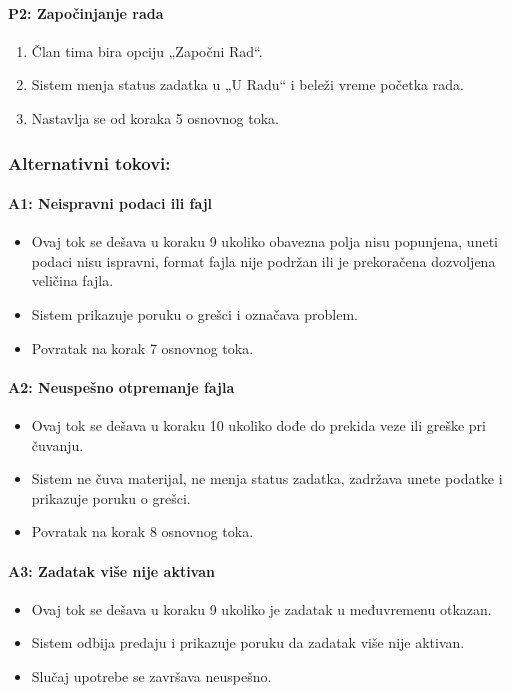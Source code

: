 \paragraph*{P2: Započinjanje rada}
\begin{enumerate}
	\item Član tima bira opciju „Započni Rad“.
	\item Sistem menja status zadatka u „U Radu“ i beleži vreme početka rada.
	\item Nastavlja se od koraka 5 osnovnog toka.
\end{enumerate}

\subsubsection*{Alternativni tokovi:}

\paragraph*{A1: Neispravni podaci ili fajl}
\begin{itemize}
	\item Ovaj tok se dešava u koraku 9 ukoliko obavezna polja nisu popunjena, uneti podaci nisu ispravni, format fajla nije podržan ili je prekoračena dozvoljena veličina fajla.
	\item Sistem prikazuje poruku o grešci i označava problem.
	\item Povratak na korak 7 osnovnog toka.
\end{itemize}

\paragraph*{A2: Neuspešno otpremanje fajla}
\begin{itemize}
	\item Ovaj tok se dešava u koraku 10 ukoliko dođe do prekida veze ili greške pri čuvanju.
	\item Sistem ne čuva materijal, ne menja status zadatka, zadržava unete podatke i prikazuje poruku o grešci.
	\item Povratak na korak 8 osnovnog toka.
\end{itemize}

\paragraph*{A3: Zadatak više nije aktivan}
\begin{itemize}
	\item Ovaj tok se dešava u koraku 9 ukoliko je zadatak u međuvremenu otkazan.
	\item Sistem odbija predaju i prikazuje poruku da zadatak više nije aktivan.
	\item Slučaj upotrebe se završava neuspešno.
\end{itemize}

